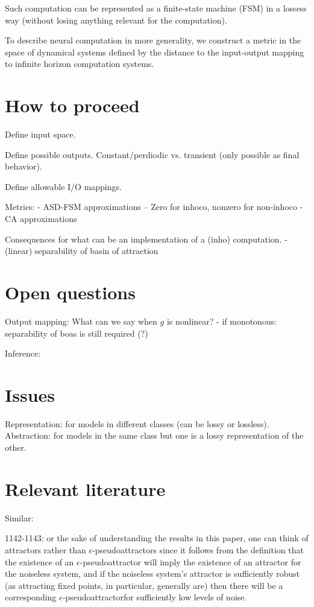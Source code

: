 \documentclass{scrartcl}
\theoremstyle{definition}
\theoremstyle{remark}
\begin{document}
Such computation can be represented as a finite-state machine (FSM) in a lossess way (without losing anything relevant for the computation).

To describe neural computation in more generality, we construct a metric in the space of dynamical systems defined by the distance to the input-output mapping to infinite horizon computation systems.


\section*{How to proceed}

Define input space.

Define possible outputs. Constant/perdiodic vs. transient (only possible as final behavior).

Define allowable I/O mappings.


Metrics:
- ASD-FSM approximations
-- Zero for inhoco, nonzero for non-inhoco
- CA approximations 


Consequences for what can be an implementation of a (inho) computation.
- (linear) separability of basin of attraction




\section*{Open questions}

Output mapping: What can we say when $g$ is nonlinear?
- if monotonous: separability of boas is still required (?)


Inference: 


\section*{Issues}


Representation: for models in different classes (can be lossy or lossless).
Abstraction: for models in the same class but one is a lossy representation of the other.

\section*{Relevant literature}
Similar: \citep{casey1996}

1142-1143:
or the sake of understanding the results in this paper, one can think of attractors rather than $\epsilon$-pseudoattractors since it follows from the definition that the existence of an $\epsilon$-pseudoattractor will imply the existence of an attractor for the noiseless system, and if the noiseless system's attractor is sufficiently robust (as attracting fixed points, in particular, generally are) then there will be a corresponding $\epsilon$-pseudoattractorfor sufficiently low levels of noise.
\end{document}
